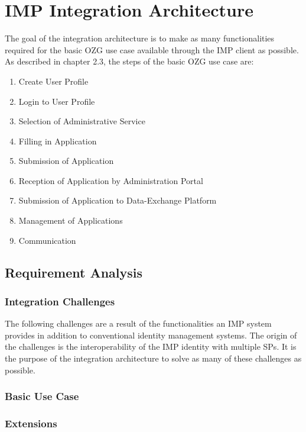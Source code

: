 \documentclass[
     12pt,         %
     a4paper,      %
     BCOR=10mm,version=first,     %
     DIV=14,version=first,        %
     ]{scrreprt}
\begin{document}
\chapter{IMP Integration Architecture}

The goal of the integration architecture is to make as many functionalities required for the basic OZG use case available through the IMP client as possible. As described in chapter 2.3, the steps of the basic OZG use case are:
\begin{enumerate}
    \item{Create User Profile}
    \item{Login to User Profile}
    \item{Selection of Administrative Service}
    \item{Filling in Application}
    \item{Submission of Application}
    \item{Reception of Application by Administration Portal}
    \item{Submission of Application to Data-Exchange Platform}
    \item{Management of Applications}
    \item{Communication}
\end{enumerate}

\section{Requirement Analysis}

\subsection{Integration Challenges}

The following challenges are a result of the functionalities an IMP system provides in addition to conventional identity management systems. The origin of the challenges is the interoperability of the IMP identity with multiple SPs. It is the purpose of the integration architecture to solve as many of these challenges as possible.

\subsection{Basic Use Case}

\subsection{Extensions}
\end{document}
